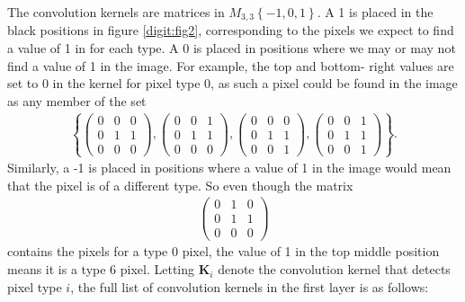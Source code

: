 \documentclass{somasmsc}
\begin{document}
The convolution kernels are matrices in $M_{3,3}\left\{-1,0,1\right\}$. A 1 is placed in the black positions in figure \ref{digit:fig2}, corresponding to the pixels we expect to find a value of 1 in for each type. A 0 is placed in positions where we may or may not find a value of 1 in the image. For example, the top and bottom- right values are set to 0 in the kernel for pixel type 0, as such a pixel could be found in the image as any member of the set
\begin{align*}
    \left\{
    \begin{pmatrix}
        0 & 0 & 0 \\
        0 & 1 & 1 \\
        0 & 0 & 0
    \end{pmatrix},
    \begin{pmatrix}
        0 & 0 & 1 \\
        0 & 1 & 1 \\
        0 & 0 & 0
    \end{pmatrix},
    \begin{pmatrix}
        0 & 0 & 0 \\
        0 & 1 & 1 \\
        0 & 0 & 1
    \end{pmatrix},
    \begin{pmatrix}
        0 & 0 & 1 \\
        0 & 1 & 1 \\
        0 & 0 & 1
    \end{pmatrix}
    \right\}.
\end{align*}
Similarly, a -1 is placed in positions where a value of 1 in the image would mean that the pixel is of a different type. So even though the matrix
\begin{align*}
    \begin{pmatrix}
        0 & 1 & 0 \\
        0 & 1 & 1 \\
        0 & 0 & 0
    \end{pmatrix}
\end{align*}
contains the pixels for a type 0 pixel, the value of 1 in the top middle position means it is a type 6 pixel. Letting $\mathbf{K}_i$ denote the convolution kernel that detects pixel type $i$, the full list of convolution kernels in the first layer is as follows:
\end{document}
